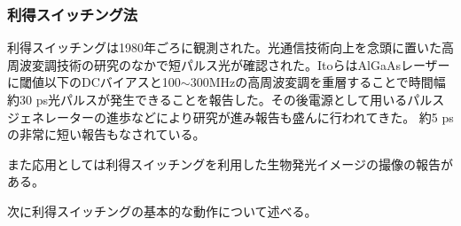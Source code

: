 \subsubsection{利得スイッチング法}
利得スイッチングは1980年ごろに観測された\cite{ref_h_ito}\cite{ref_aspin}\cite{ref_torphammar}。光通信技術向上を念頭に置いた高周波変調技術の研究のなかで短パルス光が確認された。ItoらはAlGaAsレーザーに閾値以下のDCバイアスと100$\sim$300MHzの高周波変調を重層することで時間幅約30 ps光パルスが発生できることを報告した。その後電源として用いるパルスジェネレーターの進歩などにより研究が進み報告も盛んに行われてきた。
約5 psの非常に短い報告もなされている。

また応用としては利得スイッチングを利用した生物発光イメージの撮像の報告がある\cite{ref_h_yokoyama}。


次に利得スイッチングの基本的な動作について述べる。



